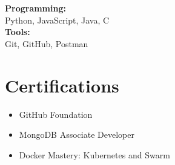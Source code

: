 \documentclass[]{plushcv}
\begin{document}
\begin{minipage}[t]{0.25\textwidth}
\textbf{Programming:}\\
Python, JavaScript, Java, C \\[4pt]

\textbf{Tools:}\\
Git, GitHub, Postman


\section{Certifications}

\begin{itemize}
  \item GitHub Foundation
  \item MongoDB Associate Developer
  \item Docker Mastery: Kubernetes and Swarm
\end{itemize}

\end{minipage} 
\end{document}
